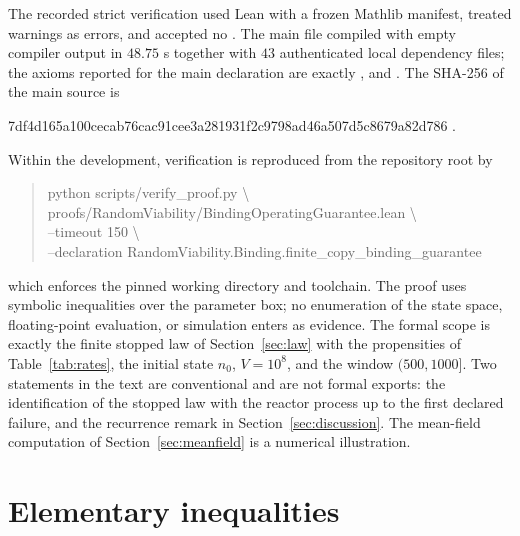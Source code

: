 \documentclass[11pt,a4paper]{article}
\theoremstyle{plain}
\theoremstyle{definition}
\theoremstyle{remark}
\begin{document}
The recorded strict verification used Lean  with a frozen Mathlib manifest, treated warnings as errors, and accepted no . The main file compiled with empty compiler output in $48.75$ s together with $43$ authenticated local dependency files; the axioms reported for the main declaration are exactly ,  and . The SHA-256 of the main source is
\begin{center}\footnotesize\ttfamily
7df4d165a100cecab76cac91cee3a281931f2c9798ad46a507d5c8679a82d786 .
\end{center}
Within the development, verification is reproduced from the repository root by
\begin{quote}\footnotesize\ttfamily
python scripts/verify\_proof.py \textbackslash\\
\hspace*{2em}proofs/RandomViability/BindingOperatingGuarantee.lean \textbackslash\\
\hspace*{2em}--timeout 150 \textbackslash\\
\hspace*{2em}--declaration RandomViability.Binding.finite\_copy\_binding\_guarantee
\end{quote}
which enforces the pinned working directory and toolchain. The proof uses symbolic inequalities over the parameter box; no enumeration of the state space, floating-point evaluation, or simulation enters as evidence. The formal scope is exactly the finite stopped law of Section~\ref{sec:law} with the propensities of Table~\ref{tab:rates}, the initial state $n_0$, $V=10^8$, and the window $(500,1000]$. Two statements in the text are conventional and are not formal exports: the identification of the stopped law with the reactor process up to the first declared failure, and the recurrence remark in Section~\ref{sec:discussion}. The mean-field computation of Section~\ref{sec:meanfield} is a numerical illustration.

\section{Elementary inequalities}\label{app:ineq}
\end{document}
